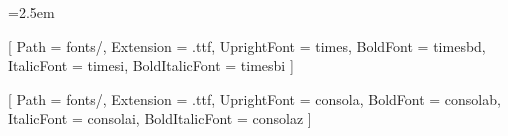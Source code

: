 \usepackage[a4paper, top=1.8cm, bottom=1.8cm, left=2.0cm, right=2.0cm]{geometry}
\usepackage{xcolor}
\usepackage{fancyhdr}
\usepackage{graphicx}
\usepackage{booktabs}
\usepackage{microtype}
\usepackage{parskip}
\usepackage{etoolbox}
\usepackage{amssymb}
\usepackage{pifont}

\AtBeginDocument{
  \def\boxtimes{\textnormal{\textbf{[\,\ding{51}\,]}}}
}

\emergencystretch=2.5em

\setmainfont{Times New Roman}[
  Path = fonts/,
  Extension = .ttf,
  UprightFont = times,
  BoldFont = timesbd,
  ItalicFont = timesi,
  BoldItalicFont = timesbi
]

\setmonofont{Consolas}[
  Path = fonts/,
  Extension = .ttf,
  UprightFont = consola,
  BoldFont = consolab,
  ItalicFont = consolai,
  BoldItalicFont = consolaz
]

\setlength{\parskip}{3pt plus 1pt minus 1pt}

\pagestyle{fancy}
\fancyhf{}
\renewcommand{\headrulewidth}{0pt}
\fancyfoot[C]{\fontsize{10pt}{12pt}\selectfont\textbf{\thepage}}
\renewcommand{\footrulewidth}{0pt}


\makeatletter
\def\@seccntformat#1{}
\renewcommand\section{\@startsection{section}{1}{\z@}%
  {-1.6ex \@plus -0.5ex \@minus -.2ex}%
  {0.8ex \@plus.2ex}%
  {\normalfont\large\bfseries\color{black}}}
\renewcommand\subsection{\@startsection{subsection}{2}{\z@}%
  {-1.4ex \@plus -0.4ex \@minus -.2ex}%
  {0.6ex \@plus.2ex}%
  {\normalfont\normalsize\bfseries\color{black}}}
\renewcommand\subsubsection{\@startsection{subsubsection}{3}{\z@}%
  {-1.2ex \@plus -0.3ex \@minus -.2ex}%
  {0.5ex \@plus.2ex}%
  {\normalfont\normalsize\bfseries\color{black}}}
\makeatother


